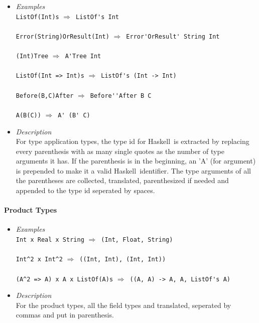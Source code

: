 \documentclass{article}
\def\H{Haskell}
\def\lra{$\Longrightarrow$\ }
\begin{document}
\begin{itemize}
\item
\textit{Examples}\\

\verb|ListOf(Int)s| \lra \verb|ListOf's Int|\\\\
\verb|Error(String)OrResult(Int)| \lra \verb|Error'OrResult' String Int|\\\\
\verb|(Int)Tree| \lra \verb|A'Tree Int|\\\\
\verb|ListOf(Int => Int)s| \lra \verb|ListOf's (Int -> Int)|\\\\
\verb|Before(B,C)After| \lra \verb|Before''After B C|\\\\
\verb|A(B(C))| \lra \verb|A' (B' C)|\\

\item
\textit{Description}\\

For type application types, the type id for \H\ is extracted by replacing every
parenthesis with as many single quotes as the number of type arguments it has.
If the parenthesis is in the beginning, an 'A' (for argument) is prepended to
make it a valid \H\ identifier.  The type arguments of all the parentheses are
collected, translated, parenthesized if needed and appended to the type id
seperated by spaces.

\end{itemize}

\paragraph{Product Types}

\begin{itemize}
\item
\textit{Examples}\\

\verb|Int x Real x String| \lra \verb|(Int, Float, String)|\\\\
\verb|Int^2 x Int^2| \lra \verb|((Int, Int), (Int, Int))|\\\\
\verb|(A^2 => A) x A x ListOf(A)s| \lra \verb|((A, A) -> A, A, ListOf's A)|\\
\item
\textit{Description}\\

For the product types, all the field types and translated, seperated by commas
and put in parenthesis.

\end{itemize}
\end{document}
